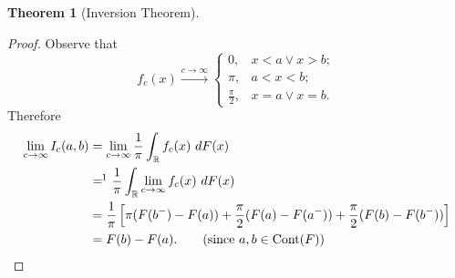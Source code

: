 \documentclass[12pt,a4paper]{report}
\theoremstyle{definition}
\newtheorem{theorem}{Theorem}[chapter] %
\theoremstyle{num.custom-title}
\DeclareMathOperator{\R}{\mathbb{R}}
\DeclareMathOperator{\Cont}{Cont}
\renewcommand{\1}{\mathbbm{1}}
\begin{document}
\begin{theorem}[Inversion Theorem]
\begin{proof}
Observe that
\[
f_c(x) \stackrel{c \to \infty}{\longrightarrow}
\begin{cases}
0, & x<a \vee x>b; \\
\pi, & a<x<b; \\
\frac{\pi}{2}, & x=a \vee x=b.
\end{cases}
\]
Therefore
\begin{align*}
\lim_{c \to \infty} I_c(a,b) 
&= \lim_{c \to \infty} \frac{1}{\pi} \int_{\R} f_c(x) \ dF(x) \\
&=\!\!\footnotemark \ \frac{1}{\pi} \int_{\R} \lim_{c \to \infty} f_c(x) \ dF(x) \\
&= \frac{1}{\pi} \left[ \pi(F(b^-)-F(a)) + \frac{\pi}{2} (F(a)-F(a^-)) + \frac{\pi}{2} (F(b)-F(b^-)) \right] \\
&= F(b) - F(a). \tag{since $a,b \in \Cont(F)$}
\end{align*}
\end{proof}
\end{theorem}
\end{document}
